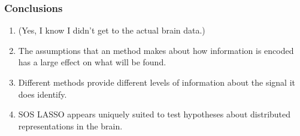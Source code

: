 \documentclass{beamer}
\begin{document}
\begin{frame}
\frametitle{Conclusions}
\begin{enumerate}
\pause \item (Yes, I know I didn't get to the actual brain data.)
\pause \item The assumptions that an method makes about how information is encoded has a large effect on what will be found.
\pause \item Different methods provide different levels of information about the signal it does identify.
\pause \item SOS LASSO appears uniquely suited to test hypotheses about distributed representations in the brain.
\end{enumerate}
\end{frame}
\end{document}
